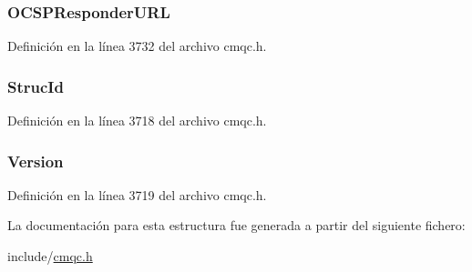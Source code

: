 \subsubsection[{O\+C\+S\+P\+Responder\+U\+R\+L}]{ O\+C\+S\+P\+Responder\+U\+R\+L}\label{structtag_m_q_a_i_r_a8e3ec4c8973e460828f035270c03144c}


Definición en la línea 3732 del archivo cmqc.\+h.

\hypertarget{structtag_m_q_a_i_r_a0530922ca944569b52601d74941f96e4}{}
\subsubsection[{Struc\+Id}]{ Struc\+Id}\label{structtag_m_q_a_i_r_a0530922ca944569b52601d74941f96e4}


Definición en la línea 3718 del archivo cmqc.\+h.

\hypertarget{structtag_m_q_a_i_r_a0656ef8f766b3907d394d88a35d7b7e9}{}
\subsubsection[{Version}]{ Version}\label{structtag_m_q_a_i_r_a0656ef8f766b3907d394d88a35d7b7e9}


Definición en la línea 3719 del archivo cmqc.\+h.



La documentación para esta estructura fue generada a partir del siguiente fichero\+:\begin{DoxyCompactItemize}
\item 
include/\hyperlink{cmqc_8h}{cmqc.\+h}\end{DoxyCompactItemize}
